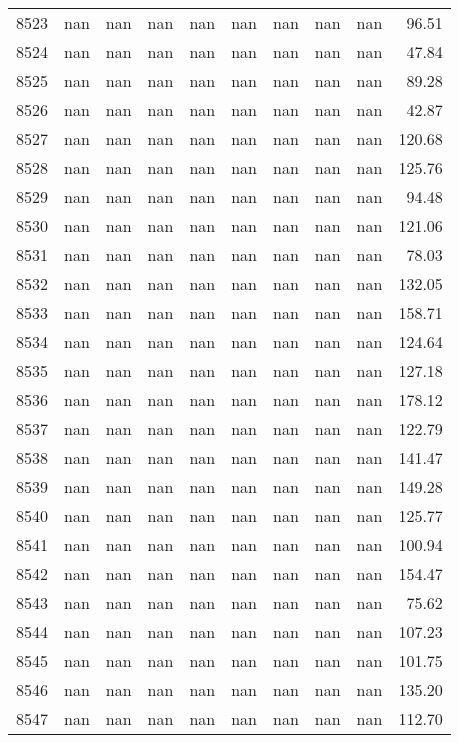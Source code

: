 \begin{tabular}{lrrrrrrrrr}
8523 & nan & nan & nan & nan & nan & nan & nan & nan & 96.51 \\
8524 & nan & nan & nan & nan & nan & nan & nan & nan & 47.84 \\
8525 & nan & nan & nan & nan & nan & nan & nan & nan & 89.28 \\
8526 & nan & nan & nan & nan & nan & nan & nan & nan & 42.87 \\
8527 & nan & nan & nan & nan & nan & nan & nan & nan & 120.68 \\
8528 & nan & nan & nan & nan & nan & nan & nan & nan & 125.76 \\
8529 & nan & nan & nan & nan & nan & nan & nan & nan & 94.48 \\
8530 & nan & nan & nan & nan & nan & nan & nan & nan & 121.06 \\
8531 & nan & nan & nan & nan & nan & nan & nan & nan & 78.03 \\
8532 & nan & nan & nan & nan & nan & nan & nan & nan & 132.05 \\
8533 & nan & nan & nan & nan & nan & nan & nan & nan & 158.71 \\
8534 & nan & nan & nan & nan & nan & nan & nan & nan & 124.64 \\
8535 & nan & nan & nan & nan & nan & nan & nan & nan & 127.18 \\
8536 & nan & nan & nan & nan & nan & nan & nan & nan & 178.12 \\
8537 & nan & nan & nan & nan & nan & nan & nan & nan & 122.79 \\
8538 & nan & nan & nan & nan & nan & nan & nan & nan & 141.47 \\
8539 & nan & nan & nan & nan & nan & nan & nan & nan & 149.28 \\
8540 & nan & nan & nan & nan & nan & nan & nan & nan & 125.77 \\
8541 & nan & nan & nan & nan & nan & nan & nan & nan & 100.94 \\
8542 & nan & nan & nan & nan & nan & nan & nan & nan & 154.47 \\
8543 & nan & nan & nan & nan & nan & nan & nan & nan & 75.62 \\
8544 & nan & nan & nan & nan & nan & nan & nan & nan & 107.23 \\
8545 & nan & nan & nan & nan & nan & nan & nan & nan & 101.75 \\
8546 & nan & nan & nan & nan & nan & nan & nan & nan & 135.20 \\
8547 & nan & nan & nan & nan & nan & nan & nan & nan & 112.70 \\

\end{tabular}
